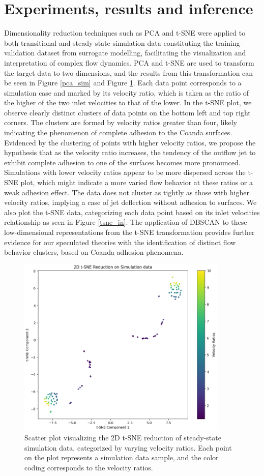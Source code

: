 \section{Experiments, results and inference}
Dimensionality reduction techniques such as PCA and t-SNE were applied to both transitional and steady-state simulation data constituting the training-validation dataset from surrogate modelling, facilitating the visualization and interpretation of complex flow dynamics. PCA and t-SNE are used to transform the target data to two dimensions, and the results from this transformation can be seen in Figure \ref{pca_sim} and Figure \ref{tsne_sim}. Each data point corresponds to a simulation case and marked by its velocity ratio, which is taken as the ratio of the higher of the two inlet velocities to that of the lower. In the t-SNE plot, we observe clearly distinct clusters of data points on the bottom left and top right corners. The clusters are formed by velocity ratios greater than four, likely indicating the phenomenon of complete adhesion to the Coanda surfaces.\\
Evidenced by the clustering of points with higher velocity ratios, we propose the hypothesis that as the velocity ratio increases, the tendency of the outflow jet to exhibit complete adhesion to one of the surfaces becomes more pronounced. Simulations with lower velocity ratios appear to be more dispersed across the t-SNE plot, which might indicate a more varied flow behavior at these ratios or a weak adhesion effect. The data does not cluster as tightly as those with higher velocity ratios, implying a case of jet deflection without adhesion to surfaces. We also plot the t-SNE data, categorizing each data point based on its inlet velocities relationship as seen in Figure \ref{tsne_in}. The application of DBSCAN to these low-dimensional representations from the t-SNE transformation provides further evidence for our speculated theories with the identification of distinct flow behavior clusters, based on Coanda adhesion phenomena. 
\begin{figure}[ht]
    \centering
    \includegraphics[width=10cm]{images/Clustering/tsne_sim_cmap.png}
    \caption{Scatter plot visualizing the 2D t-SNE reduction of steady-state simulation data, categorized by varying velocity ratios. Each point on the plot represents a simulation data sample, and the color coding corresponds to the velocity ratios.}
    \label{tsne_sim}
    \end{figure}
